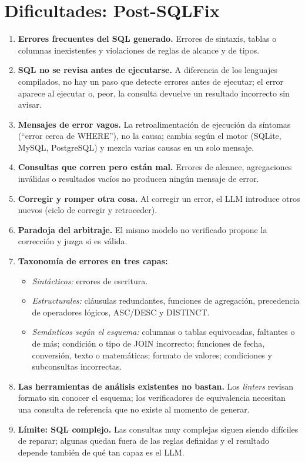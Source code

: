 \documentclass[11pt,a4paper]{article}
\begin{document}
\section{Dificultades: Post-SQLFix}
\begin{enumerate}
  \item \textbf{Errores frecuentes del SQL generado.} Errores de sintaxis, tablas o columnas inexistentes y violaciones de reglas de alcance y de tipos.
  \item \textbf{SQL no se revisa antes de ejecutarse.} A diferencia de los lenguajes compilados, no hay un paso que detecte errores antes de ejecutar; el error aparece al ejecutar o, peor, la consulta devuelve un resultado incorrecto sin avisar.
  \item \textbf{Mensajes de error vagos.} La retroalimentación de ejecución da síntomas (``error cerca de WHERE''), no la causa; cambia según el motor (SQLite, MySQL, PostgreSQL) y mezcla varias causas en un solo mensaje.
  \item \textbf{Consultas que corren pero están mal.} Errores de alcance, agregaciones inválidas o resultados vacíos no producen ningún mensaje de error.
  \item \textbf{Corregir y romper otra cosa.} Al corregir un error, el LLM introduce otros nuevos (ciclo de corregir y retroceder).
  \item \textbf{Paradoja del arbitraje.} El mismo modelo no verificado propone la corrección y juzga si es válida.
  \item \textbf{Taxonomía de errores en tres capas:}
  \begin{itemize}
    \item \textit{Sintácticos:} errores de escritura.
    \item \textit{Estructurales:} cláusulas redundantes, funciones de agregación, precedencia de operadores lógicos, ASC/DESC y DISTINCT.
    \item \textit{Semánticos según el esquema:} columnas o tablas equivocadas, faltantes o de más; condición o tipo de JOIN incorrecto; funciones de fecha, conversión, texto o matemáticas; formato de valores; condiciones y subconsultas incorrectas.
  \end{itemize}
  \item \textbf{Las herramientas de análisis existentes no bastan.} Los \textit{linters} revisan formato sin conocer el esquema; los verificadores de equivalencia necesitan una consulta de referencia que no existe al momento de generar.
  \item \textbf{Límite: SQL complejo.} Las consultas muy complejas siguen siendo difíciles de reparar; algunas quedan fuera de las reglas definidas y el resultado depende también de qué tan capaz es el LLM.
\end{enumerate}
\end{document}
